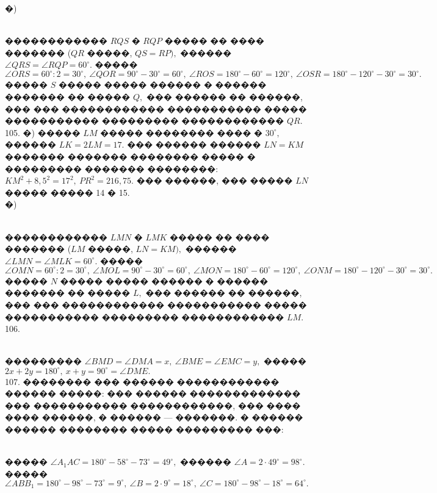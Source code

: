\documentclass[12pt]{article}
\begin{document}
�)\begin{figure}[ht!]
\end{figure}\\
������������ $RQS$ � $RQP$ ����� �� ���� ������� ($QR$ �����, $QS=RP),$ ������ $\angle QRS=\angle RQP=60^\circ.$ ����� $\angle ORS=60^\circ:2=30^\circ,\ \angle QOR=90^\circ-30^\circ=60^\circ,\ \angle ROS=180^\circ-60^\circ=120^\circ,\ \angle OSR=180^\circ-120^\circ-30^\circ=30^\circ.$ ����� $S$ ����� ����� ������ � ������ ������� �� ����� $Q,$ ��� ������ �� ������, ��� ��� ������������ ����������� ����� ����������� ��������� ������������ $QR.$\\
105. �) ����� $LM$ ����� �������� ���� � $30^\circ,$ ������ $LK=2LM=17.$ ��� ������ ������ $LN=KM$ ������� ������� �������� ����� � ��������� ������� ��������: $KM^2+8,5^2=17^2,\ PR^2=216,75.$ ��� ������, ��� ����� $LN$ ����� ����� 14 � 15.\\
�)\begin{figure}[ht!]
\end{figure}\\
������������ $LMN$ � $LMK$ ����� �� ���� ������� ($LM$ �����, $LN=KM),$ ������ $\angle LMN=\angle MLK=60^\circ.$ ����� $\angle OMN=60^\circ:2=30^\circ,\ \angle MOL=90^\circ-30^\circ=60^\circ,\ \angle MON=180^\circ-60^\circ=120^\circ,\ \angle ONM=180^\circ-120^\circ-30^\circ=30^\circ.$ ����� $N$ ����� ����� ������ � ������ ������� �� ����� $L,$ ��� ������ �� ������, ��� ��� ������������ ����������� ����� ����������� ��������� ������������ $LM.$\\
106. \begin{figure}[ht!]
\end{figure}\\
��������� $\angle BMD=\angle DMA=x,\ \angle BME=\angle EMC=y,$ ����� $2x+2y=180^\circ,\ x+y=90^\circ=\angle DME.$\\
107. �������� ��� ������ ������������ ������ �����: ��� ������ ������������� ��� ����������� ������������, ��� ���� ���� ������, � ������ --- �������. � ������ ������ �������� ����� ��������� ���:
\begin{figure}[ht!]
\end{figure}\\
����� $\angle A_1AC=180^\circ-58^\circ-73^\circ=49^\circ,$ ������ $\angle A=2\cdot49^\circ=98^\circ.$ ����� $\angle ABB_1=180^\circ-98^\circ-73^\circ=9^\circ,\ \angle B=2\cdot9^\circ=18^\circ,\ \angle C=180^\circ-98^\circ-18^\circ=64^\circ.$\\
\end{document}
